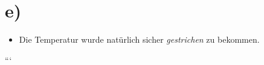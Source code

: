 

\section*{e)}

\begin{itemize}
    \item Die Temperatur wurde natürlich sicher \textit{gestrichen} zu bekommen.
\end{itemize}

```